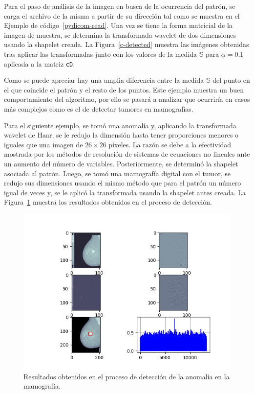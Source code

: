 \par Para el paso de an\'alisis de la imagen en busca de la ocurrencia del patr\'on, se carga el archivo de la misma a partir de su direcci\'on tal como se muestra en el Ejemplo de c\'odigo~\ref{pydicom-read}. Una vez se tiene la forma matricial de la imagen de muestra, se determina la transformada wavelet de dos dimensiones usando la shapelet creada. La Figura~\ref{c-detected} muestra las im\'agenes obtenidas tras aplicar las transformadas junto con los valores de la medida $\mathbb{S}$ para $\alpha=0.1$ aplicada a la matriz \texttt{cD}.

\par Como se puede apreciar hay una amplia diferencia entre la medida $\mathbb{S}$ del punto en el que coincide el patr\'on y el resto de los puntos. Este ejemplo muestra un buen comportamiento del algoritmo, por ello se pasar\'a a analizar que ocurrir\'ia en casos m\'as complejos como es el de detectar tumores en mamograf\'ias.\\

\par Para el siguiente ejemplo, se tom\'o una anomal\'ia y, aplicando la transformada wavelet de Haar, se le redujo la dimensi\'on hasta tener proporciones menores o iguales que una imagen de $26\times 26$ p\'ixeles. La raz\'on se debe a la efectividad mostrada por los m\'etodos de resoluci\'on de sistemas de ecuaciones no lineales ante un aumento del n\'umero de variables. Posteriormente, se determin\'o la shapelet asociada al patr\'on. Luego, se tom\'o una mamograf\'ia digital con el tumor, se redujo sus dimensiones usando el mismo m\'etodo que para el patr\'on un n\'umero igual de veces y, se le aplic\'o la transformada usando la shapelet antes creada. La Figura~\ref{detect-anomalia} muestra los resultados obtenidos en el proceso de detecci\'on.

\begin{figure}[h]
\center
\includegraphics[scale=.6]{Graphics/MamografiaDetect.png}
\caption{Resultados obtenidos en el proceso de detecci\'on de la anomal\'ia en la mamograf\'ia.}
\label{detect-anomalia}
\end{figure}

